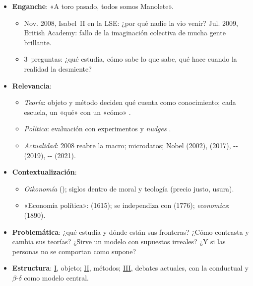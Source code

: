 \documentclass{article}
\begin{document}
\cabecerarepaso
\begin{columnas}

\begin{itemize}
\item \textbf{Enganche}: «A toro pasado, todos somos Manolete».
  \begin{itemize}
  \item Nov. 2008, Isabel~II en la LSE: ¿por qué nadie la vio venir? Jul. 2009, British Academy: fallo de la imaginación colectiva de mucha gente brillante.
  \item 3~preguntas: ¿qué estudia, cómo sabe lo que sabe, qué hace cuando la realidad la desmiente?
  \end{itemize}
\item \textbf{Relevancia}:
  \begin{itemize}
  \item \emph{Teoría}: objeto y método deciden qué cuenta como conocimiento; cada escuela, un «qué» con un «cómo»  .
  \item \emph{Política}: evaluación con experimentos y \emph{nudges} .
  \item \emph{Actualidad}: 2008 reabre la macro; microdatos; Nobel  (2002),  (2017), -- (2019), -- (2021).
  \end{itemize}
\item \textbf{Contextualización}:
  \begin{itemize}
  \item \emph{Oikonomía} (); siglos dentro de moral y teología (precio justo, usura).
  \item «Economía política»:  (1615); se independiza con  (1776); \emph{economics}:  (1890).
  \end{itemize}
\item \textbf{Problemática}: ¿qué estudia y dónde están sus fronteras? ¿Cómo contrasta y cambia sus teorías? ¿Sirve un modelo con supuestos irreales? ¿Y si las personas no se comportan como supone?
\item \textbf{Estructura}: \hyperref[rep:I]{I}, objeto; \hyperref[rep:II]{II}, métodos; \hyperref[rep:III]{III}, debates actuales, con la conductual y $\beta$-$\delta$ como modelo central.
\end{itemize}


\end{columnas}
\end{document}
